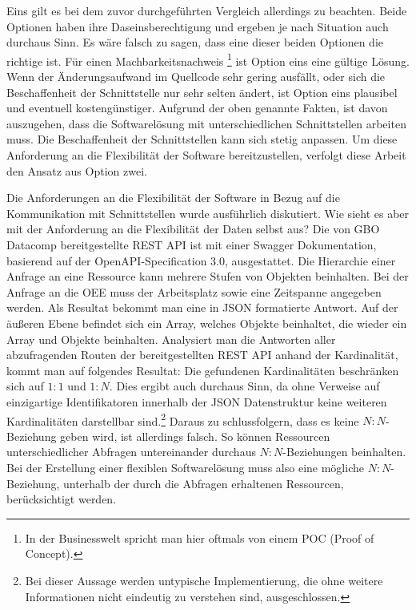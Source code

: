 Eins gilt es bei dem zuvor durchgeführten Vergleich allerdings zu beachten. Beide Optionen haben ihre Daseinsberechtigung
und ergeben je nach Situation auch durchaus Sinn. Es wäre falsch zu sagen, dass eine dieser beiden Optionen die richtige ist. Für einen
Machbarkeitsnachweis \footnote{In der Businesswelt spricht man hier oftmals von einem POC (Proof of Concept).}
ist Option eins eine gültige Lösung. Wenn der Änderungsaufwand im Quellcode sehr gering ausfällt, oder sich
die Beschaffenheit der Schnittstelle nur sehr selten ändert, ist Option eins plausibel und eventuell kostengünstiger.
Aufgrund der oben genannte Fakten, ist davon auszugehen, dass die Softwarelösung mit unterschiedlichen Schnittstellen arbeiten muss.
Die Beschaffenheit der Schnittstellen kann sich stetig anpassen. Um diese Anforderung an die Flexibilität
der Software bereitzustellen, verfolgt diese Arbeit den Ansatz aus Option zwei.

Die Anforderungen an die Flexibilität der Software in Bezug auf die Kommunikation mit Schnittstellen wurde
ausführlich diskutiert. Wie sieht es aber mit der Anforderung an die Flexibilität der Daten selbst aus?
Die von GBO Datacomp bereitgestellte REST API ist mit einer Swagger Dokumentation, basierend auf der
OpenAPI-Specification 3.0, ausgestattet. Die Hierarchie einer Anfrage an eine Ressource kann mehrere Stufen von Objekten beinhalten.
Bei der Anfrage an die OEE muss der Arbeitsplatz sowie eine Zeitspanne angegeben werden. Als Resultat bekommt man eine 
in JSON formatierte Antwort. Auf der äußeren Ebene befindet sich ein Array, welches Objekte beinhaltet, die wieder ein
Array und Objekte beinhalten. Analysiert man die Antworten aller abzufragenden Routen der bereitgestellten REST API anhand der Kardinalität,
kommt man auf folgendes Resultat: Die gefundenen Kardinalitäten beschränken sich auf \(1:1\) und \(1:N\). Dies ergibt auch
durchaus Sinn, da ohne Verweise auf einzigartige Identifikatoren innerhalb der JSON Datenstruktur keine weiteren
Kardinalitäten darstellbar sind.\footnote{Bei dieser Aussage werden untypische Implementierung,
die ohne weitere Informationen nicht eindeutig zu verstehen sind, ausgeschlossen.}
Daraus zu schlussfolgern, dass es keine \(N:N\)-Beziehung geben wird, ist allerdings falsch.
So können Ressourcen unterschiedlicher Abfragen untereinander durchaus \(N:N\)-Beziehungen beinhalten. Bei der Erstellung
einer flexiblen Softwarelösung muss also eine mögliche \(N:N\)-Beziehung, unterhalb der durch die Abfragen erhaltenen
Ressourcen, berücksichtigt werden.

